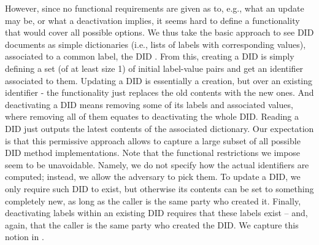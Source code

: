 However, since no functional requirements are given as to, e.g., what an update
may be, or what a deactivation implies, it seems hard to define a functionality
that would cover all possible options.
%
We thus take the basic approach to see DID documents as simple dictionaries
(i.e., lists of labels with corresponding values), associated to a common label,
the DID . From this, creating a DID is simply
defining a set (of at least size 1) of initial label-value pairs and get an
identifier associated to them. Updating a DID is essentially a creation, but
over an existing identifier - the functionality just replaces the old contents
with the new ones. And deactivating a DID means removing some of its labels and
associated values, where removing all of them equates to deactivating the whole
DID. Reading a DID just outputs the latest contents of the associated
dictionary.
%
Our expectation is that this permissive approach allows to capture a large
subset of all possible DID method implementations. Note that the functional
restrictions we impose seem to be unavoidable. Namely, we do not specify how
the actual identifiers are computed; instead, we allow the adversary to pick
them. To update a DID, we only require such DID to exist, but otherwise its
contents can be set to something completely new, as long as the caller is the
same party who created it. Finally, deactivating labels within an existing DID
requires that these labels exist -- and, again, that the caller is the same
party who created the DID.
%
We capture this notion in .


